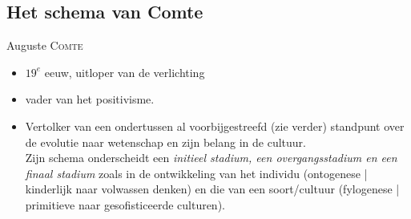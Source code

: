 \subsection{Het schema van Comte}
Auguste \textsc{Comte}
\begin{itemize}
\item $19^e$ eeuw, uitloper van de verlichting
\item vader van het positivisme.
\item Vertolker van een ondertussen al voorbijgestreefd (zie verder) standpunt over de evolutie naar wetenschap en zijn belang in de cultuur. \\ Zijn schema onderscheidt een \emph{initieel stadium, een overgangsstadium en een finaal stadium} zoals in de ontwikkeling van het individu (ontogenese | kinderlijk naar volwassen denken) en die van een soort/cultuur (fylogenese | primitieve naar gesofisticeerde culturen).
\end{itemize} 
